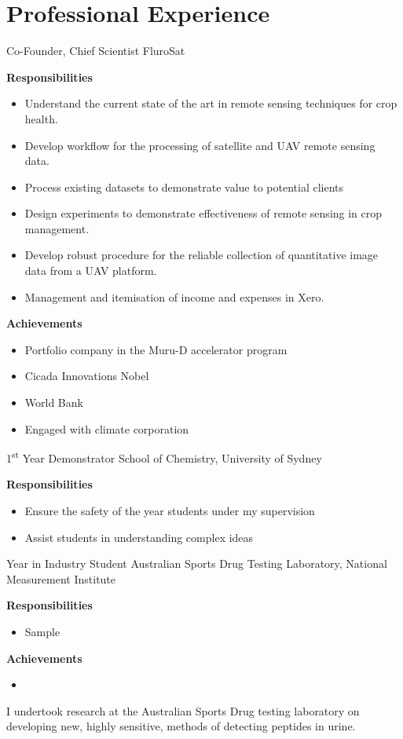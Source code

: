 \nocite{*}
\printbibliography[title={Publications}]

\section{Professional Experience}

{Co-Founder, Chief Scientist}
{FluroSat}{}{}
{%
\textbf{Responsibilities}
  \begin{itemize}
    \item Understand the current state of the art in remote sensing techniques for crop health.
    \item Develop workflow for the processing of satellite and UAV remote sensing data.
    \item Process existing datasets to demonstrate value to potential clients
    \item Design experiments to demonstrate effectiveness of remote sensing in crop management.
    \item Develop robust procedure for the reliable collection of quantitative image data from a UAV platform.
    \item Management and itemisation of income and expenses in Xero.
  \end{itemize}
  \textbf{Achievements}
  \begin{itemize}
    \item Portfolio company in the Muru-D accelerator program
    \item Cicada Innovations Nobel %
    \item World Bank %
    \item Engaged with climate corporation %
  \end{itemize}
}

{1\textsuperscript{st} Year Demonstrator}
{School of Chemistry, University of Sydney}
{}{}
{%
\textbf{Responsibilities}
    \begin{itemize}
      \item Ensure the safety of the  year students under my supervision
        \item Assist students in understanding complex ideas
    \end{itemize}
}

{Year in Industry Student}
{Australian Sports Drug Testing Laboratory, National Measurement Institute}
{}{}
{%
\textbf{Responsibilities}
  \begin{itemize}
    \item Sample
  \end{itemize}
  \textbf{Achievements}
  \begin{itemize}
    \item 
  \end{itemize}
I undertook research at the Australian Sports Drug testing laboratory on developing new, highly sensitive, methods of detecting peptides in urine.}

